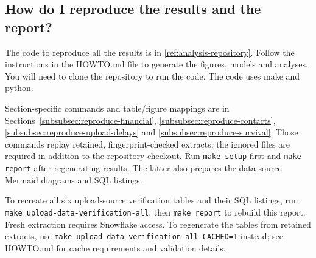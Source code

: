 \subsection{How do I reproduce the results and the report?}
The code to reproduce all the results is in \ref{ref:analysis-repository}. Follow the instructions in the HOWTO.md file to generate the figures, models and analyses. You will need to clone the repository to run the code. The code uses make and python.

Section-specific commands and table/figure mappings are in
Sections~\ref{subsubsec:reproduce-financial}, \ref{subsubsec:reproduce-contacts},
\ref{subsubsec:reproduce-upload-delays} and \ref{subsubsec:reproduce-survival}.
Those commands replay retained, fingerprint-checked extracts; the ignored
 files are required in addition to the repository checkout.
Run \texttt{make setup} first and \texttt{make report} after regenerating results.
The latter also prepares the data-source Mermaid diagrams and SQL listings.

To recreate all six upload-source verification tables and their SQL listings,
run \texttt{make upload-data-verification-all}, then \texttt{make report} to
rebuild this report. Fresh extraction requires Snowflake access. To regenerate
the tables from retained extracts, use
\texttt{make upload-data-verification-all CACHED=1} instead; see HOWTO.md for
cache requirements and validation details.
